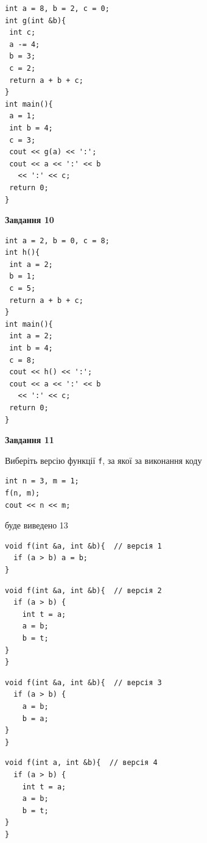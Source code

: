 \documentclass[12pt, ukrainian]{article}
\def\code#1{\Verb!#1!}
\begin{document}
{\begin {large}
\begin{minipage}[t]{7.0cm}
\begin{verbatim}
int a = 8, b = 2, c = 0;
int g(int &b){
 int c;
 a -= 4;
 b = 3;
 c = 2;
 return a + b + c;
}
int main(){
 a = 1;
 int b = 4;
 c = 3;
 cout << g(a) << ':';
 cout << a << ':' << b 
   << ':' << c;
 return 0;
}
\end{verbatim}



\begin{center}
\textbf{Завдання 10}
\end{center}
\vspace{-8mm}

\begin{verbatim}
int a = 2, b = 0, c = 8;
int h(){
 int a = 2;
 b = 1;
 c = 5;
 return a + b + c;
}
int main(){
 int a = 2;
 int b = 4;
 c = 8;
 cout << h() << ':';
 cout << a << ':' << b 
   << ':' << c;
 return 0;
}
\end{verbatim}

\end{minipage}
\vline \hspace{1mm}
\begin{minipage}[t]{11.0cm}

\begin{center}
\textbf{Завдання 11}
\end{center}
Виберіть версію функції \code{f}, за якої за виконання коду
\begin{verbatim}
int n = 3, m = 1;
f(n, m);
cout << n << m;
\end{verbatim}

буде виведено 13

\begin{verbatim}
void f(int &a, int &b){  // версія 1
  if (a > b) a = b;
}
\end{verbatim}

\vspace{-8mm}\begin{verbatim}
void f(int &a, int &b){  // версія 2
  if (a > b) {
    int t = a;
    a = b;
    b = t;
}  
}
\end{verbatim}

\vspace{-8mm}\begin{verbatim}
void f(int &a, int &b){  // версія 3
  if (a > b) {
    a = b;
    b = a;
}  
}
\end{verbatim}

\vspace{-8mm}\begin{verbatim}
void f(int a, int &b){  // версія 4
  if (a > b) {
    int t = a;
    a = b;
    b = t;
}  
}
\end{verbatim}




\end{minipage}
\end{large}}
\end{document}
